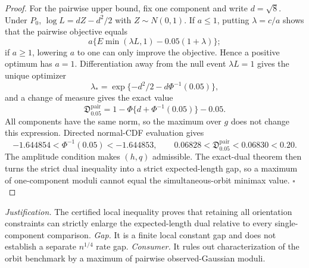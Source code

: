 \documentclass{article}
\begin{document}
\begin{proof}
For the pairwise upper bound, fix one component and write
\(d=\sqrt8\).  Under \(P_0\),
\(\log L=dZ-d^2/2\) with \(Z\sim N(0,1)\).  If \(a\leq1\), putting
\(\lambda=c/a\) shows that the pairwise objective equals
\[
a\{E\min(\lambda L,1)-0.05(1+\lambda)\};
\]
if \(a\geq1\), lowering \(a\) to one can only improve the objective.  Hence a
positive optimum has \(a=1\).  Differentiation away from the null event
\(\lambda L=1\) gives the unique optimizer
\[
\lambda_*=
\exp\{-d^2/2-d\Phi^{-1}(0.05)\},
\]
and a change of measure gives the exact value
\[
\mathfrak D_{0.05}^{\mathrm{pair}}
=1-\Phi\{d+\Phi^{-1}(0.05)\}-0.05.
\]
All components have the same norm, so the maximum over \(g\) does not change
this expression.  Directed normal-CDF evaluation gives
\[
-1.644854<\Phi^{-1}(0.05)<-1.644853,
\qquad
0.06828<\mathfrak D_{0.05}^{\mathrm{pair}}<0.06830<0.20.
\]
The amplitude condition makes \((h,q)\) admissible.  The exact-dual theorem
then turns the strict dual inequality into a strict expected-length gap, so a
maximum of one-component moduli cannot equal the simultaneous-orbit minimax
value. \(\square\)
\end{proof}
\par\smallskip\noindent \textit{Justification.} The certified local inequality proves that retaining all orientation constraints can strictly enlarge the expected-length dual relative to every single-component comparison. \textit{Gap.} It is a finite local constant gap and does not establish a separate \(n^{1/4}\) rate gap. \textit{Consumer.} It rules out characterization of the orbit benchmark by a maximum of pairwise observed-Gaussian moduli.
\end{document}
